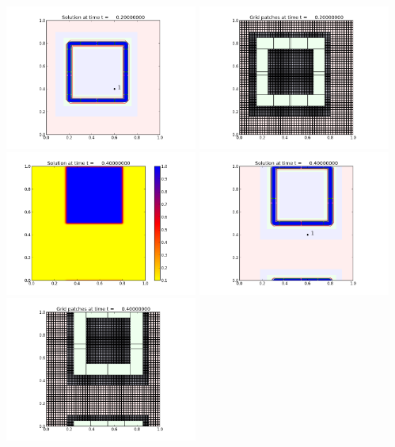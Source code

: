 \documentclass[11pt]{article}
\begin{document}
\includegraphics[width=0.475\textwidth]{frame0001fig1.png}
\vskip 10pt 
\includegraphics[width=0.475\textwidth]{frame0001fig2.png}
\vskip 10pt 
\includegraphics[width=0.475\textwidth]{frame0002fig0.png}
\includegraphics[width=0.475\textwidth]{frame0002fig1.png}
\vskip 10pt 
\includegraphics[width=0.475\textwidth]{frame0002fig2.png}
\end{document}
